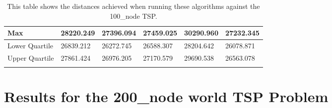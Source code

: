 \begin{longtable}[c]{|p{1.4cm}|p{2cm}|p{2cm}|p{2cm}|p{3cm}|p{2cm}|}
Max                 & 28220.249  & 27396.094  & 27459.025  & 30290.960                & 27232.345   \\ \hline
Lower Quartile & 26839.212  & 26272.745  & 26588.307  & 28204.642                & 26078.871   \\ \hline
Upper Quartile      & 27861.424  & 26976.205  & 27170.579  & 29690.538                & 26563.078   \\ \hline
\caption{This table shows the distances achieved when running these algorithms against the 100\_node TSP.}
\label{tab:experiment_100_node_distances}\\
\end{longtable}



\section{Results for the 200\_node world TSP Problem}

